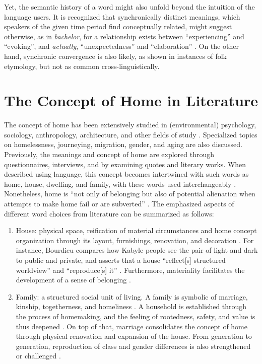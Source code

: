 Yet, the semantic history of a word might also unfold beyond the intuition of the language users.  It is recognized that synchronically distinct meanings, which speakers of the given time period find conceptually related, might suggest otherwise, as in \textit{bachelor}, for a relationship exists between ``experiencing'' and ``evoking'', and \textit{actually}, ``unexpectedness'' and ``elaboration'' \parencite[13]{traugott2001regularity}. On the other hand, synchronic convergence is also likely, as shown in instances of folk etymology, but not as common cross­-linguistically.

\section{The Concept of Home in Literature}
The concept of home has been extensively studied in (environmental) psychology, sociology, anthropology, architecture, and other fields of study \parencite{samanani2019house,mallett2004understanding,moore2000placing,sixsmith1986meaning}. Specialized topics on homelessness, journeying, migration, gender, and aging are also discussed. Previously, the meanings and concept of home are explored through questionnaires, interviews, and by examining quotes and literary works. When described using language, this concept becomes intertwined with such words as home, house, dwelling, and family, with these words used interchangeably \parencite{mallett2004understanding,sixsmith1986meaning}. Nonetheless, home is ``not only of belonging but also of potential alienation when attempts to make home fail or are subverted'' \parencite{samanani2019house}. The emphasized aspects of different word choices from literature can be summarized as follows: 

\begin{enumerate}
    \item House: physical space, reification of material circumstances and home concept organization through its layout, furnishings, renovation, and decoration \parencite{samanani2019house}. For instance, Bourdieu compares how Kabyle people see the pair of light and dark to public and private, and asserts that a house ``reflect[s] structured worldview'' and ``reproduce[s] it'' \parencite{samanani2019house}. Furthermore, materiality facilitates the development of a sense of belonging \parencite{moore2000placing}.
    \item Family: a structured social unit of living. A family is symbolic of marriage, kinship, togetherness, and homeliness \parencite{samanani2019house}. A household is established through the process of homemaking, and the feeling of rootedness, safety, and value is thus deepened \parencite{samanani2019house,moore2000placing}. On top of that, marriage consolidates the concept of home through physical renovation and expansion of the house. From generation to generation, reproduction of class and gender differences is also strengthened or challenged \parencite{samanani2019house,mallett2004understanding}.
\end{enumerate}

